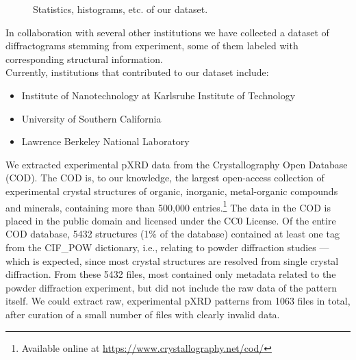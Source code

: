 



\begin{figure*}[!ht]
    \centering
    \missingfigure{} 
    \caption{Statistics, histograms, etc. of our dataset.}
    \label{fig:statistics}
\end{figure*}

In collaboration with several other institutions we have collected a dataset of diffractograms stemming from experiment, some of them labeled with corresponding structural information. \\
Currently, institutions that contributed to our dataset include:
\begin{itemize}
    \item Institute of Nanotechnology at Karlsruhe Institute of Technology
    \item University of Southern California
    \item Lawrence Berkeley National Laboratory
\end{itemize}


We extracted experimental pXRD data from the Crystallography Open Database (COD).\cite{Grazulis2009, Vaitkus2023}  The COD is, to our knowledge, the largest open-access collection of experimental crystal structures of organic, inorganic, metal-organic compounds and minerals, containing more than 500,000 entries.\footnote{Available online at \url{https://www.crystallography.net/cod/}} The data in the COD is placed in the public domain and licensed under the CC0 License. Of the entire COD database, 5432 structures (1\% of the database) contained at least one tag from the {CIF\_POW} dictionary, i.e., relating to powder diffraction studies --- which is expected, since most crystal structures are resolved from single crystal diffraction. From these 5432 files, most contained only metadata related to the powder diffraction experiment, but did not include the raw data of the pattern itself. We could extract raw, experimental pXRD patterns from 1063 files in total, after curation of a small number of files with clearly invalid data.

